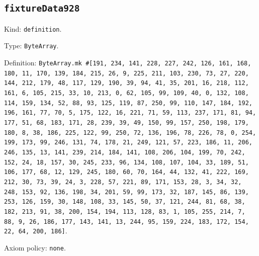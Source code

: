 \documentclass[11pt]{article}
\begin{document}
\subsection*{\texttt{fixtureData928}}
\noindent Kind: \texttt{definition}.\par
\noindent Type: \texttt{ByteArray}.\par
\noindent Definition: \texttt{ByteArray.mk \#[191, 234, 141, 228, 227, 242, 126, 161, 168, 180, 11, 170, 139, 184, 215, 26, 9, 225, 211, 103, 230, 73, 27, 220, 144, 212, 179, 48, 117, 129, 190, 39, 94, 41, 35, 201, 16, 218, 112, 161, 6, 105, 215, 33, 10, 213, 0, 62, 105, 99, 109, 40, 0, 132, 108, 114, 159, 134, 52, 88, 93, 125, 119, 87, 250, 99, 110, 147, 184, 192, 196, 161, 77, 70, 5, 175, 122, 16, 221, 71, 59, 113, 237, 171, 81, 94, 177, 51, 68, 183, 171, 28, 239, 39, 49, 150, 99, 157, 250, 198, 179, 180, 8, 38, 186, 225, 122, 99, 250, 72, 136, 196, 78, 226, 78, 0, 254, 199, 173, 99, 246, 131, 74, 178, 21, 249, 121, 57, 223, 186, 11, 206, 246, 135, 13, 141, 239, 214, 184, 141, 108, 206, 104, 199, 70, 242, 152, 24, 18, 157, 30, 245, 233, 96, 134, 108, 107, 104, 33, 189, 51, 106, 177, 68, 12, 129, 245, 180, 60, 70, 164, 44, 132, 41, 222, 169, 212, 30, 73, 39, 24, 3, 228, 57, 221, 89, 171, 153, 28, 3, 34, 32, 248, 153, 92, 136, 198, 34, 201, 59, 99, 173, 32, 187, 145, 86, 139, 253, 126, 159, 30, 148, 108, 33, 145, 50, 37, 121, 244, 81, 68, 38, 182, 213, 91, 38, 200, 154, 194, 113, 128, 83, 1, 105, 255, 214, 7, 88, 9, 26, 186, 177, 143, 141, 13, 244, 95, 159, 224, 183, 172, 154, 22, 64, 200, 186]}.\par
\noindent Axiom policy: \texttt{none}.\par
\end{document}
